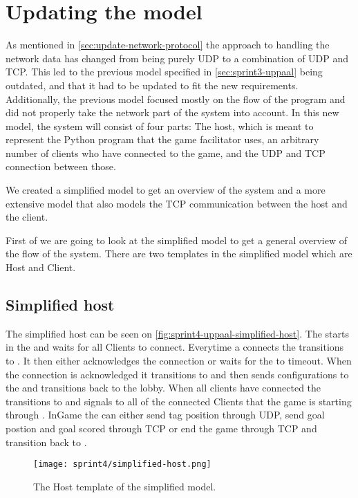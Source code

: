 \section{Updating the \uppaal model}
As mentioned in \autoref{sec:update-network-protocol} the approach to handling the network data has changed from being purely UDP to a combination of UDP and TCP.
This led to the previous \uppaal model specified in \autoref{sec:sprint3-uppaal} being outdated, and that it had to be updated to fit the new requirements.
\\
Additionally, the previous model focused mostly on the flow of the program and did not properly take the network part of the system into account.
In this new model, the system will consist of four parts: The host, which is meant to represent the Python program that the game facilitator uses, an arbitrary number of clients who have connected to the game, and the UDP and TCP connection between those.

We created a simplified model to get an overview of the system and a more extensive model that also models the TCP communication between the host and the client.

First of we are going to look at the simplified model to get a general overview of the flow of the system.
There are two templates in the simplified model which are Host and Client.

\subsection*{Simplified host}
The simplified host can be seen on \autoref{fig:sprint4-uppaal-simplified-host}. 
The  starts in the  and waits for all Clients to connect.
Everytime a  connects the  transitions to  .
It then either acknowledges the connection or waits for the   to timeout.
When the connection is acknowledged it transitions to  and then sends configurations to the  and transitions back to the lobby.
When all clients have connected the  transitions to  and signals to all of the connected Clients that the game is starting through .
InGame the  can either send tag position through UDP, send goal postion and goal scored through TCP or end the game through TCP and transition back to .
\begin{figure}[h]
    \centering
    \texttt{[image: sprint4/simplified-host.png]}
    \caption{The Host template of the simplified \uppaal model.}
    \label{fig:sprint4-uppaal-simplified-host}
\end{figure}

